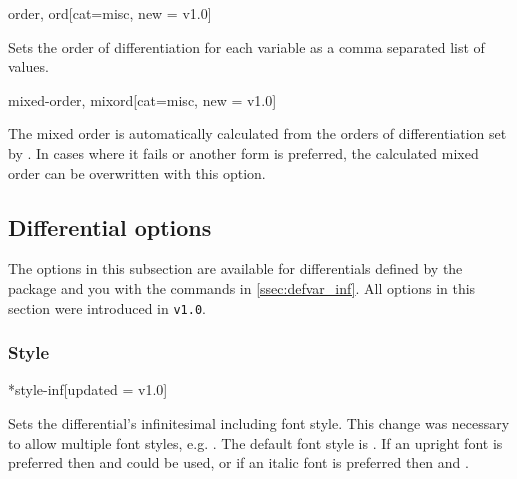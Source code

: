 	\clearpage
	
	\begin{option}{order, ord}[cat=misc, new = v1.0]
		\begin{values}[default = 1]
		\end{values}
		Sets the order of differentiation for each variable as a comma separated list of values.
	\end{option}
	
	\bigskip\bigskip
	
	\begin{option}{mixed-order, mixord}[cat=misc, new = v1.0]
		\begin{values}[default = 1]
		\end{values}
		The mixed order is automatically calculated from the orders of differentiation set by . 
		In cases where it fails or another form is preferred, the calculated mixed order can be overwritten with this option.
	\end{option}
	
	\subsection{Differential options} \label{ssec:options_inf}
	The options in this subsection are available for differentials defined by the package and you with the commands in \cref{ssec:defvar_inf}. All options in this section were introduced in \texttt{v1.0}.
	
	\subsubsection*{Style}
	
	\begin{option}*{style-inf}[updated = v1.0]
		\begin{values}[default = d]
		\end{values}
		Sets the differential's infinitesimal including font style. This change was necessary to allow multiple font styles, e.g. . The default font style is . If an upright font is preferred then \pdf{} and \uni{} could be used, or if an italic font is preferred then \pdf{} and \uni.
	\end{option}
	
